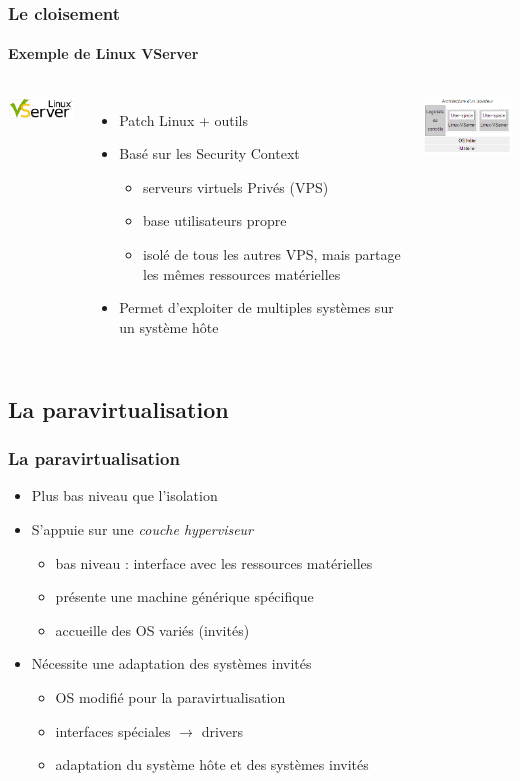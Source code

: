 \begin{frame}
\frametitle{Le cloisement}
\framesubtitle{Exemple de Linux VServer}
\begin{columns}
\includegraphics[width=3cm]{../illustration/VServer.png}
\begin{itemize}
\item Patch Linux + outils
\item Basé sur les Security Context
\begin{itemize}
\item serveurs virtuels Privés (VPS)
\item base utilisateurs propre
\item isolé de tous les autres VPS, mais partage les mêmes ressources matérielles
\end{itemize}
\item Permet d'exploiter de multiples systèmes sur un système hôte
\end{itemize}
\includegraphics[width=4cm]{../illustration/VServer-archi.png}
\end{columns}
\end{frame}



\subsection{La paravirtualisation}

\begin{frame}
\frametitle{La paravirtualisation}
\begin{itemize}
\item Plus bas niveau que l'isolation
\item S’appuie sur une \emph{couche hyperviseur}
\begin{itemize}
\item bas niveau : interface avec les ressources matérielles
\item présente une machine générique spécifique
\item accueille des OS variés (invités)
\end{itemize}
\item <2>Nécessite une adaptation des systèmes invités
\begin{itemize}
\item OS modifié pour la paravirtualisation
\item interfaces spéciales $\rightarrow$ drivers
\item adaptation du système hôte et des systèmes invités
\end{itemize}
\end{itemize}
\end{frame}

